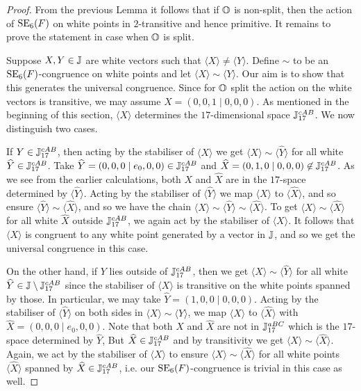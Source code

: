 \begin{proof}
	From the previous Lemma it follows that if $\mathbb{O}$ is non-split, then the action of 
	$\mathrm{SE}_6(F)$ on white points in $2$-transitive and hence primitive. It remains to prove
	the statement in case when $\mathbb{O}$ is split.

	Suppose $X,Y \in \mathbb{J}$ are white vectors such that $\langle X \rangle \neq
	\langle Y \rangle$. Define $\sim$ to be an \mbox{$\mathrm{SE}_6(F)$-congruence} on white points and
	let $\langle X\rangle \sim \langle Y\rangle$. Our aim is to show that this generates 
	the universal congruence. 
	Since for $\mathbb{O}$ split the action on the white vectors is transitive, we may assume
	$X = (0,0,1 \mid 0,0,0)$. As mentioned in the beginning of this section, 
	$\langle X\rangle$ 
	determines the $17$-dimensional space $\mathbb{J}_{17}^{cAB}$. We now distinguish
	two cases.
	
	If $Y \in \mathbb{J}_{17}^{cAB}$, then acting by the stabiliser of $\langle X\rangle$ 
	we get $\langle X\rangle \sim \langle \hat{Y}\rangle $ for all white 
	$\widehat{Y} \in \mathbb{J}_{17}^{cAB}$. Take
	$\widehat{Y} = (0,0,0\mid e_0,0,0) \in \mathbb{J}_{17}^{cAB}$ and 
	\mbox{$\widehat{X} = (0,1,0\mid 0,0,0)
	\not\in \mathbb{J}_{17}^{cAB}$}. As we see from the earlier calculations, both
	$X$ and $\hat{X}$ are in the $17$-space determined by $\langle \hat{Y} \rangle$. 
	Acting by the
	stabiliser of $\langle \hat{Y}\rangle$ 
	we map $\langle X\rangle $ to $\langle \hat{X} \rangle $,
	and so ensure $\langle \hat{Y} \rangle \sim \langle \hat{X} \rangle$,
	and so we have the chain $\langle X\rangle \sim \langle\hat{Y}\rangle \sim 
	\langle\hat{X}\rangle$. To get $\langle X\rangle \sim \langle\hat{X}\rangle$ for 
	all white $\hat{X}$ outside $\mathbb{J}_{17}^{cAB}$, we again act by the stabiliser of $\langle
	X\rangle$.
	It follows that $\langle X \rangle$ is congruent to any white point generated by a 
	vector in $\mathbb{J}$, and so we get the universal congruence in this case.
	
	On the other hand, if $Y$ lies outside of $\mathbb{J}_{17}^{cAB}$, then we get $\langle X
	\rangle\sim \langle\hat{Y}\rangle$
	for all white $\widehat{Y} \in \mathbb{J}\setminus \mathbb{J}_{17}^{cAB}$ since the stabiliser of 
	$\langle X\rangle$ is transitive on the white points spanned by those. 
	In particular, we may take $\hat{Y} = (1,0,0\mid 0,0,0)$.
	Acting by the stabiliser of $\langle\hat{Y}\rangle$ on both sides in 
	$\langle X\rangle \sim \langle\hat{Y}\rangle$, we map 
	$\langle X\rangle$ to $\langle \hat{X}\rangle$ with $\hat{X} = (0,0,0\mid e_0,0,0)$.
	Note that both $X$ and $\hat{X}$ are not 
	in $\mathbb{J}_{17}^{aBC}$ which is the $17$-space determined by $\hat{Y}$, But 
	$\widehat{X} \in \mathbb{J}_{17}^{cAB}$ and by transitivity we get $\langle X\rangle 
	\sim \langle \hat{X} \rangle$. Again,
	we act by the stabiliser of $\langle X\rangle $ to ensure $\langle X\rangle  \sim
	\langle \hat{X} \rangle$ for all white points $\langle \hat{X} \rangle$ spanned by 
	$\widehat{X} \in \mathbb{J}_{17}^{cAB}$, i.e. our $\mathrm{SE}_6(F)$-congruence is trivial in this case 
	as well.
\end{proof}


